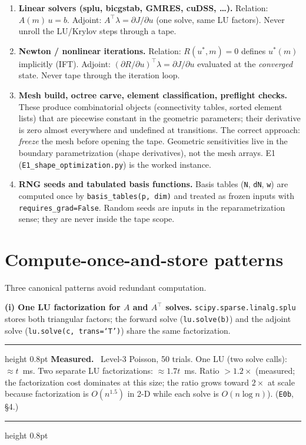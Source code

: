 \documentclass[11pt]{article}
\newenvironment{measured}{%
  \par\medskip\noindent\begin{minipage}{\linewidth}
  \hrule height 0.8pt \smallskip
  \textbf{Measured.}\ }{%
  \smallskip\hrule height 0.8pt \end{minipage}\par\medskip}
\begin{document}
\begin{enumerate}
\item \textbf{Linear solvers (splu, bicgstab, GMRES, cuDSS, \ldots).}
  Relation: $A(m)\,u = b$.  Adjoint: $A^\top \lambda = \partial J/
  \partial u$ (one solve, same LU factors).  Never unroll the
  LU/Krylov steps through a tape.

\item \textbf{Newton / nonlinear iterations.}
  Relation: $R(u^*, m) = 0$ defines $u^*(m)$ implicitly (IFT).
  Adjoint: $(\partial R/\partial u)^\top \lambda = \partial J/\partial u$
  evaluated at the \emph{converged} state.  Never tape through the
  iteration loop.

\item \textbf{Mesh build, octree carve, element classification,
  preflight checks.}
  These produce combinatorial objects (connectivity tables, sorted
  element lists) that are piecewise constant in the geometric parameters;
  their derivative is zero almost everywhere and undefined at transitions.
  The correct approach: \emph{freeze} the mesh before opening the tape.
  Geometric sensitivities live in the boundary parametrization (shape
  derivatives), not the mesh arrays.  E1
  (\texttt{E1\_shape\_optimization.py}) is the worked instance.

\item \textbf{RNG seeds and tabulated basis functions.}
  Basis tables (\texttt{N}, \texttt{dN}, \texttt{w}) are computed once by
  \texttt{basis\_tables(p,~dim)} and treated as frozen inputs with
  \texttt{requires\_grad=False}.  Random seeds are inputs in the
  reparametrization sense; they are never inside the tape scope.
\end{enumerate}

\section{Compute-once-and-store patterns}
\label{sec:computeonce}

Three canonical patterns avoid redundant computation.

\textbf{(i) One LU factorization for $A$ and $A^\top$ solves.}
\texttt{scipy\-.sparse\-.linalg\-.splu} stores both triangular factors; the
forward solve (\texttt{lu.solve(b)}) and the adjoint solve
(\texttt{lu.solve(c,~trans=`T')}) share the same factorization.

\begin{measured}
Level-3 Poisson, 50 trials.  One LU (two solve calls): $\approx t$~ms.
Two separate LU factorizations: $\approx 1.7t$~ms.  Ratio $> 1.2\times$
(measured; the factorization cost dominates at this size; the ratio
grows toward $2\times$ at scale because factorization is
$O(n^{1.5})$ in 2-D while each solve is $O(n\log n)$).
(\texttt{E0b}, \S4.)
\end{measured}
\end{document}
